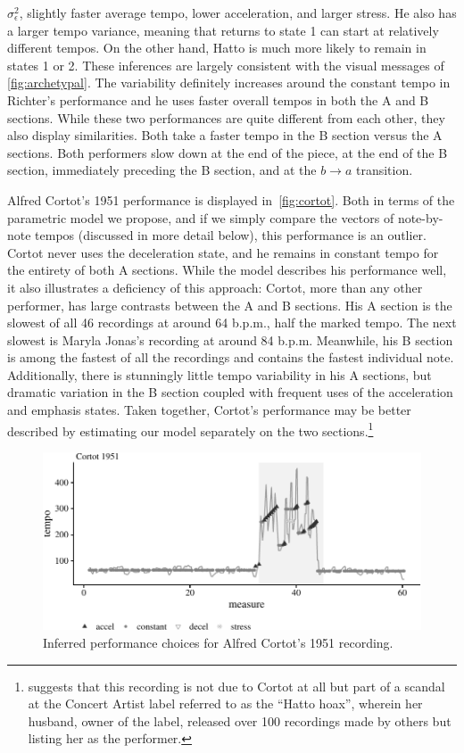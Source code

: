 \documentclass[aoas]{imsart}
\begin{document}
$\sigma^2_{\epsilon}$, slightly faster average tempo, lower
acceleration, and larger stress. He also has a larger tempo variance,
meaning that returns to state 1 can start at relatively different
tempos. On the other hand, Hatto is much more
likely to remain in states 1 or 2. These inferences are largely
consistent with the visual messages of \autoref{fig:archetypal}. The
variability definitely increases around the constant tempo in
Richter's performance and he uses faster overall tempos in both the A and
B sections.
%
While these two performances are quite different from each other, they
also display similarities. Both take a faster tempo in the B
section versus the A sections. Both performers slow down at the end of
the piece, at the end of the B section, immediately preceding the B section, and at the
$b\rightarrow a$ transition.

Alfred Cortot's 1951 performance is displayed
in~\autoref{fig:cortot}. Both in terms of the parametric model we
propose, and if we simply compare the vectors of note-by-note tempos
(discussed in more detail below), this performance is an
outlier. Cortot never uses the deceleration state, and he remains in
constant tempo for the entirety of both A sections. While the model
describes his performance well, it also illustrates a deficiency of
this approach: Cortot, more than any other performer, has large
contrasts between the A and B sections. His A section is the slowest
of all 46 recordings at around 64 b.p.m., half the marked
tempo. The next slowest is Maryla Jonas's recording at around 84
b.p.m. Meanwhile, his B section is among the fastest of all the
recordings and contains the fastest individual note. Additionally,
there is stunningly little tempo variability in his A sections, but
dramatic variation in the B section coupled with frequent uses of the
acceleration and emphasis states. Taken together, Cortot's performance
may be better described by estimating our model separately on the two
sections.\footnote{\citet{Cook2013} suggests that this recording is not
  due to Cortot at all but part of a scandal at the Concert Artist label
  referred to as the ``Hatto hoax'', wherein her husband, owner of the
  label, released over 100 recordings made by others but listing her
  as the performer.}
\begin{figure}[t]
  \centering
    \includegraphics[width=.9\textwidth]{cortot-performance-1}
  \caption{Inferred performance choices for Alfred Cortot's 1951
    recording.}
  \label{fig:cortot}
\end{figure}
\end{document}
